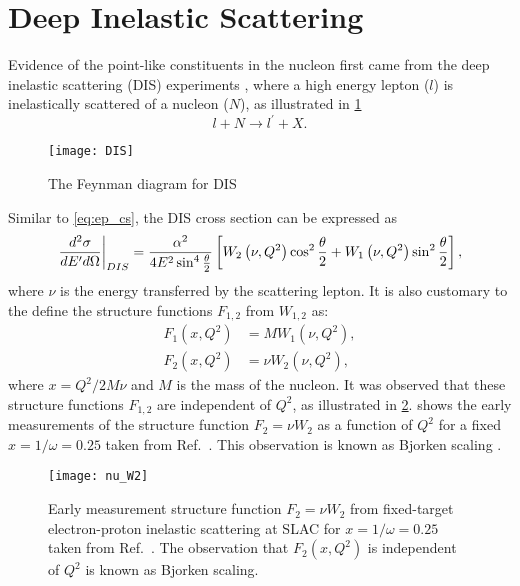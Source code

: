 \documentclass[../main.tex]{subfiles}
\begin{document}
\section {Deep Inelastic Scattering}
\label{sec:dis}
Evidence of the point-like constituents in the nucleon first came from the deep
inelastic scattering (DIS) experiments \cite{breidenbach1969}, where a high
energy lepton ($l$) is inelastically scattered of a nucleon ($N$), as
illustrated in \cref{fig:DIS}
\begin{equation}
	l + N \rightarrow l^\prime + X.
\end{equation}
\begin{figure}[htbp!]
	\centering
	\texttt{[image: DIS]}
	\caption{The Feynman diagram for DIS}
	\label{fig:DIS}
\end{figure}
Similar to \cref{eq:ep_cs}, the DIS cross section can be expressed as
\begin{equation}
	\eval{\frac{d^2\sigma}{dE^\prime d\Omega}}_{DIS} = \frac{\alpha^2}{4E^2 \sin^4
		\frac{\theta}{2}} \left[ W_2\left(\nu,Q^2\right)\cos^2
		\frac{\theta}{2} + W_1\left(\nu,Q^2\right)\sin^2 \frac{\theta}{2}
		\right],
	\label{eq:DIS_cs1}
\end{equation}
where $\nu$ is the energy transferred by the scattering lepton. It is also
customary to the define the structure functions $F_{1,2}$ from $W_{1,2}$ as:
\begin{equation}
	\begin{split}
		F_1\left(x,Q^2\right) &= MW_1\left(\nu,Q^2\right),\\
		F_2\left(x,Q^2\right) &= \nu W_2\left(\nu,Q^2\right),
	\end{split}
\end{equation}
where $x=Q^2/2M\nu$ and $M$ is the mass of the nucleon. It was observed that
these structure functions $F_{1,2}$ are independent of $Q^2$, as illustrated in
\cref{fig:w2}.  shows the early measurements of the
structure function $F_2=\nu W_2$ as a function of $Q^2$ for a fixed
$x=1/\omega=0.25$ taken from Ref.~\cite{friedman1972}. This observation is
known as Bjorken scaling \cite{bjorken1969}.
\begin{figure}[htpb!]
	\centering
	\texttt{[image: nu\_W2]}
	\caption{Early measurement structure function $F_2=\nu W_2$ from
		fixed-target electron-proton inelastic scattering at SLAC for
		$x=1/\omega=0.25$ taken from Ref.~\cite{friedman1972}. The observation
		that $F_2(x,Q^2)$ is independent of $Q^2$ is known as Bjorken scaling. }
	\label{fig:w2}
\end{figure}
\end{document}
